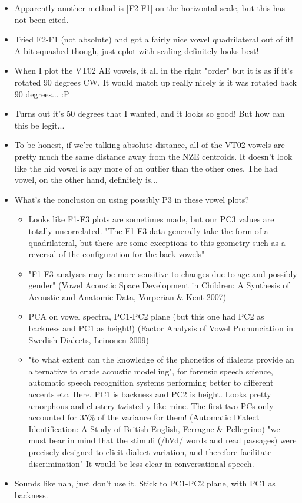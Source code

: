 \documentclass{article}
\begin{document}
\begin{itemize}
\begin{itemize}
        \item Apparently another method is |F2-F1| on the horizontal scale, but this has not been cited.
        \item Tried F2-F1 (not absolute) and got a fairly nice vowel quadrilateral out of it! A bit squashed though, just eplot with scaling definitely looks best!
        \item When I plot the VT02 AE vowels, it all in the right "order" but it is as if it's rotated 90 degrees CW. It would match up really nicely is it was rotated back 90 degrees... :P
        \item Turns out it's 50 degrees that I wanted, and it looks so good! But how can this be legit...
        \item To be honest, if we're talking absolute distance, all of the VT02 vowels are pretty much the same distance away from the NZE centroids. It doesn't look like the hid vowel is any more of an outlier than the other ones. The had vowel, on the other hand, definitely is...
        \item What's the conclusion on using possibly P3 in these vowel plots?
        \begin{itemize}
            \item Looks like F1-F3 plots are sometimes made, but our PC3 values are totally uncorrelated. "The F1-F3 data generally take the form of a quadrilateral, but there are some exceptions to this geometry such as a reversal of the configuration for the back vowels" 
            \item "F1-F3 analyses may be more sensitive to changes due to age and possibly gender" (Vowel Acoustic Space Development in Children: A Synthesis of Acoustic and Anatomic Data, Vorperian & Kent 2007)
            \item PCA on vowel spectra, PC1-PC2 plane (but this one had PC2 as backness and PC1 as height!) (Factor Analysis of Vowel Pronunciation in Swedish Dialects, Leinonen 2009)
            \item "to what extent can the knowledge of the phonetics of dialects provide an alternative to crude acoustic modelling", for forensic speech science, automatic speech recognition systems performing better to different accents etc. Here, PC1 is backness and PC2 is height. Looks pretty amorphous and clustery twisted-y like mine. The first two PCs only accounted for 35\% of the variance for them! (Automatic Dialect Identification: A Study of British English, Ferragne & Pellegrino) "we must bear in mind that the stimuli (/hVd/ words and read
passages) were precisely designed to elicit dialect variation, and therefore facilitate discrimination" It would be less clear in conversational speech.
        \end{itemize}
        \item Sounds like nah, just don't use it. Stick to PC1-PC2 plane, with PC1 as backness.
    \end{itemize}
\end{itemize}
\end{document}
